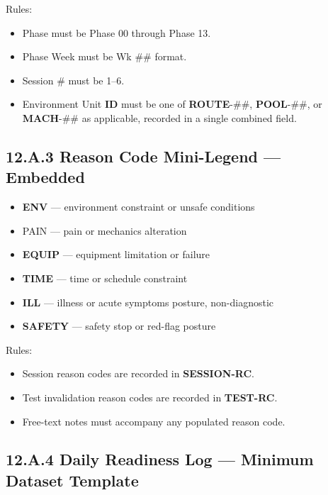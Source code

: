 \documentclass[10pt]{article}
\begin{document}
\begin{landscape}
Rules:

\begin{itemize}
\item Phase must be Phase 00 through Phase 13.
\item Phase Week must be Wk \#\# format.
\item Session \# must be 1–6.
\item Environment Unit \textbf{ID} must be one of \textbf{ROUTE}-\#\#, \textbf{POOL}-\#\#, or \textbf{MACH}-\#\# as applicable, recorded in a single combined field.
\end{itemize}

\newpage

\subsection*{12.A.3 Reason Code Mini-Legend — Embedded}
{}

\begin{itemize}
\item \textbf{ENV} — environment constraint or unsafe conditions
\item PAIN — pain or mechanics alteration
\item \textbf{EQUIP} — equipment limitation or failure
\item \textbf{TIME} — time or schedule constraint
\item \textbf{ILL} — illness or acute symptoms posture, non-diagnostic
\item \textbf{SAFETY} — safety stop or red-flag posture
\end{itemize}

Rules:

\begin{itemize}
\item Session reason codes are recorded in \textbf{SESSION-RC}.
\item Test invalidation reason codes are recorded in \textbf{TEST-RC}.
\item Free-text notes must accompany any populated reason code.
\end{itemize}

\subsection*{12.A.4 Daily Readiness Log — Minimum Dataset Template}
{}


\end{landscape}
\end{document}
